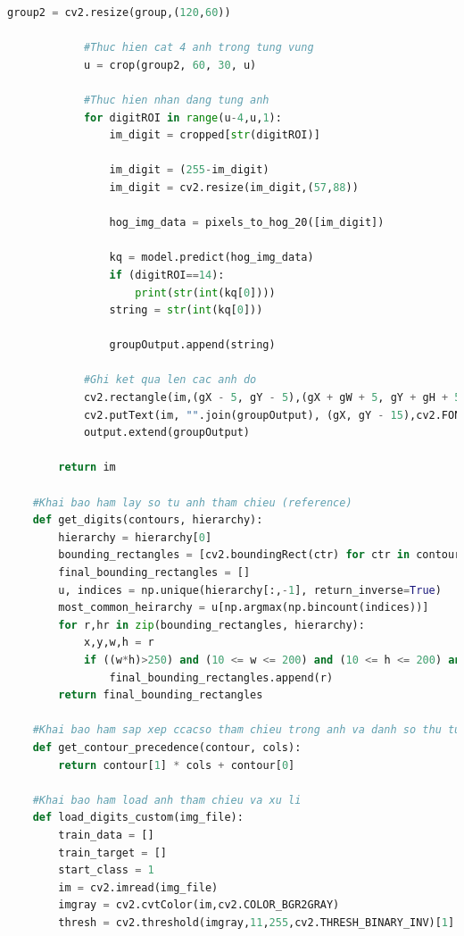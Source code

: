 \begin{lstlisting}[language=Python, caption=Recognition Visa]
            group2 = cv2.resize(group,(120,60))
    
            #Thuc hien cat 4 anh trong tung vung 
            u = crop(group2, 60, 30, u)
    
            #Thuc hien nhan dang tung anh
            for digitROI in range(u-4,u,1):
                im_digit = cropped[str(digitROI)]
                
                im_digit = (255-im_digit)
                im_digit = cv2.resize(im_digit,(57,88))
    
                hog_img_data = pixels_to_hog_20([im_digit])
                
                kq = model.predict(hog_img_data)
                if (digitROI==14):
                    print(str(int(kq[0])))
                string = str(int(kq[0]))
    
                groupOutput.append(string)
    
            #Ghi ket qua len cac anh do 
            cv2.rectangle(im,(gX - 5, gY - 5),(gX + gW + 5, gY + gH + 5), (0, 0, 255), 2)
            cv2.putText(im, "".join(groupOutput), (gX, gY - 15),cv2.FONT_HERSHEY_SIMPLEX, 0.65, (255, 0, 0), 2)
            output.extend(groupOutput)
    
        return im
    
    #Khai bao ham lay so tu anh tham chieu (reference)
    def get_digits(contours, hierarchy):
        hierarchy = hierarchy[0]
        bounding_rectangles = [cv2.boundingRect(ctr) for ctr in contours]   
        final_bounding_rectangles = []
        u, indices = np.unique(hierarchy[:,-1], return_inverse=True)
        most_common_heirarchy = u[np.argmax(np.bincount(indices))]
        for r,hr in zip(bounding_rectangles, hierarchy):
            x,y,w,h = r
            if ((w*h)>250) and (10 <= w <= 200) and (10 <= h <= 200) and hr[3] == most_common_heirarchy: 
                final_bounding_rectangles.append(r)    
        return final_bounding_rectangles
    
    #Khai bao ham sap xep ccacso tham chieu trong anh va danh so thu tu
    def get_contour_precedence(contour, cols):
        return contour[1] * cols + contour[0]
    
    #Khai bao ham load anh tham chieu va xu li
    def load_digits_custom(img_file):
        train_data = []
        train_target = []
        start_class = 1
        im = cv2.imread(img_file)
        imgray = cv2.cvtColor(im,cv2.COLOR_BGR2GRAY)
        thresh = cv2.threshold(imgray,11,255,cv2.THRESH_BINARY_INV)[1]   
           

\end{lstlisting}
